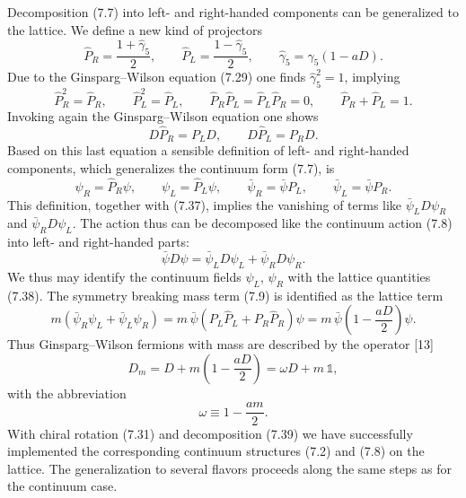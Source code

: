 Decomposition (7.7) into left- and right-handed components can be generalized
to the lattice. We define a new kind of projectors
\begin{equation}
  \hat P_R = \frac{1+\hat\gamma_5}{2}, \qquad
  \hat P_L = \frac{1-\hat\gamma_5}{2}, \qquad
  \hat\gamma_5 = \gamma_5(1 - aD) .
\end{equation}
Due to the Ginsparg--Wilson equation (7.29) one finds
$\hat\gamma_5^2 = 1$, implying
\begin{equation}
  \hat P_R^2 = \hat P_R, \qquad
  \hat P_L^2 = \hat P_L, \qquad
  \hat P_R\hat P_L = \hat P_L\hat P_R = 0, \qquad
  \hat P_R + \hat P_L = 1 .
\end{equation}
Invoking again the Ginsparg--Wilson equation one shows
\begin{equation}
  D\hat P_R = P_L D, \qquad
  D\hat P_L = P_R D .
\end{equation}
Based on this last equation a sensible definition of left- and right-handed
components, which generalizes the continuum form (7.7), is
\begin{equation}
  \psi_R = \hat P_R\psi, \qquad \psi_L = \hat P_L\psi,
  \qquad
  \bar\psi_R = \bar\psi P_L, \qquad \bar\psi_L = \bar\psi P_R .
\end{equation}
This definition, together with (7.37), implies the vanishing of terms like
$\bar\psi_L D\psi_R$ and $\bar\psi_R D\psi_L$. The action thus can be
decomposed like the continuum action (7.8) into left- and right-handed parts:
\begin{equation}
  \bar\psi D\psi = \bar\psi_L D\psi_L + \bar\psi_R D\psi_R .
\end{equation}
We thus may identify the continuum fields $\psi_L$, $\psi_R$ with the lattice
quantities (7.38). The symmetry breaking mass term (7.9) is identified as the
lattice term
\begin{equation}
  m\left(\bar\psi_R\psi_L + \bar\psi_L\psi_R\right)
  = m\,\bar\psi\left(P_L\hat P_L + P_R\hat P_R\right)\psi
  = m\,\bar\psi\left(1-\frac{aD}{2}\right)\psi .
\end{equation}
Thus Ginsparg--Wilson fermions with mass are described by the operator [13]
\begin{equation}
  D_m = D + m\left(1-\frac{aD}{2}\right) = \omega D + m\,\mathbb{1},
\end{equation}
with the abbreviation
\begin{equation}
  \omega \equiv 1-\frac{am}{2} .
\end{equation}
With chiral rotation (7.31) and decomposition (7.39) we have successfully
implemented the corresponding continuum structures (7.2) and (7.8) on the
lattice. The generalization to several flavors proceeds along the same steps
as for the continuum case.

